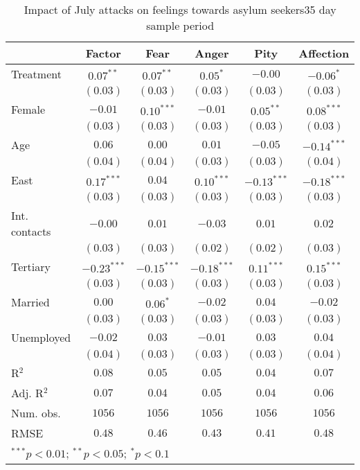 
\begin{table}
\caption{Impact of July attacks on feelings towards asylum seekers35 day sample period}
\begin{center}
\begin{tabular}{l c c c c c}
\toprule
 & Factor & Fear & Anger & Pity & Affection \\
\midrule
Treatment     & $0.07^{**}$   & $0.07^{**}$   & $0.05^{*}$    & $-0.00$       & $-0.06^{*}$   \\
              & $(0.03)$      & $(0.03)$      & $(0.03)$      & $(0.03)$      & $(0.03)$      \\
Female        & $-0.01$       & $0.10^{***}$  & $-0.01$       & $0.05^{**}$   & $0.08^{***}$  \\
              & $(0.03)$      & $(0.03)$      & $(0.03)$      & $(0.03)$      & $(0.03)$      \\
Age           & $0.06$        & $0.00$        & $0.01$        & $-0.05$       & $-0.14^{***}$ \\
              & $(0.04)$      & $(0.04)$      & $(0.03)$      & $(0.03)$      & $(0.04)$      \\
East          & $0.17^{***}$  & $0.04$        & $0.10^{***}$  & $-0.13^{***}$ & $-0.18^{***}$ \\
              & $(0.03)$      & $(0.03)$      & $(0.03)$      & $(0.03)$      & $(0.03)$      \\
Int. contacts & $-0.00$       & $0.01$        & $-0.03$       & $0.01$        & $0.02$        \\
              & $(0.03)$      & $(0.03)$      & $(0.02)$      & $(0.02)$      & $(0.03)$      \\
Tertiary      & $-0.23^{***}$ & $-0.15^{***}$ & $-0.18^{***}$ & $0.11^{***}$  & $0.15^{***}$  \\
              & $(0.03)$      & $(0.03)$      & $(0.03)$      & $(0.03)$      & $(0.03)$      \\
Married       & $0.00$        & $0.06^{*}$    & $-0.02$       & $0.04$        & $-0.02$       \\
              & $(0.03)$      & $(0.03)$      & $(0.03)$      & $(0.03)$      & $(0.03)$      \\
Unemployed    & $-0.02$       & $0.03$        & $-0.01$       & $0.03$        & $0.04$        \\
              & $(0.04)$      & $(0.03)$      & $(0.03)$      & $(0.03)$      & $(0.04)$      \\
\midrule
R$^2$         & $0.08$        & $0.05$        & $0.05$        & $0.04$        & $0.07$        \\
Adj. R$^2$    & $0.07$        & $0.04$        & $0.05$        & $0.04$        & $0.06$        \\
Num. obs.     & $1056$        & $1056$        & $1056$        & $1056$        & $1056$        \\
RMSE          & $0.48$        & $0.46$        & $0.43$        & $0.41$        & $0.48$        \\
\bottomrule
\multicolumn{6}{l}{\scriptsize{$^{***}p<0.01$; $^{**}p<0.05$; $^{*}p<0.1$}}
\end{tabular}
\label{tab_emo_35}
\end{center}
\end{table}
